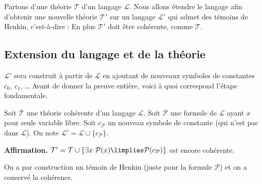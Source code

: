 \documentclass[11pt,class=report,crop=false]{standalone}
\begin{document}
Partons d'une théorie $\mathcal{T}$ d'un langage $\mathcal{L}$. Nous allons étendre le langage afin d'obtenir une nouvelle théorie $\mathcal{T}'$ sur un langage $\mathcal{L}'$ qui admet des témoins de Henkin, c'est-à-dire :
 En plus $\mathcal{T}'$ doit être cohérente, comme $\mathcal{T}$.

\subsection{Extension du langage et de la théorie}

$\mathcal{L}'$ sera construit à partir de $\mathcal{L}$ en ajoutant de nouveaux symboles de constantes $c_0$, $c_1$, \ldots{}
Avant de donner la preuve entière, voici à quoi correspond l'étape fondamentale.


Soit $\mathcal{T}$ une théorie cohérente d'un langage $\mathcal{L}$. Soit $\mathcal{P}$ une formule de $\mathcal{L}$ ayant $x$ pour seule variable libre. Soit $c_{\mathcal{P}}$ un nouveau symbole de constante (qui n'est pas dans $\mathcal{L}$). On note $\mathcal{L}' = \mathcal{L} \cup \{c_{\mathcal{P}}\}$.

\medskip

\textbf{Affirmation.} $\mathcal{T}' = \mathcal{T} \cup \{\exists x\ \mathcal{P}(x) \limplies \mathcal{P}(c_{\mathcal{P}})\}$ est encore cohérente.

On a par construction un témoin de Henkin (juste pour la formule $\mathcal{P}$) et on a conservé la cohérence.
\end{document}
